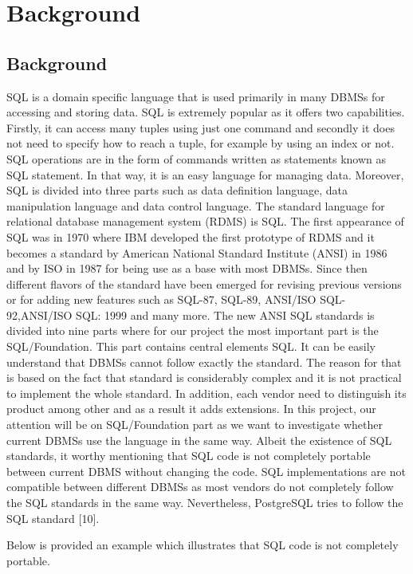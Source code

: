 
\chapter{Background}

\section{Background}
SQL is a domain specific language that is used primarily in many DBMSs for accessing and storing data. SQL is extremely popular as it offers two capabilities. Firstly, it can access many tuples using just one command and secondly it does not need to specify how to reach a tuple, for example by using an index or not. SQL operations are in the form of commands written as statements known as SQL statement. In that way, it is an easy language for managing data. Moreover, SQL is divided into three parts such as data definition language, data manipulation language and data control language. 
	The standard language for relational database management system (RDMS) is SQL. The first appearance of SQL was in 1970 where IBM developed the first prototype of RDMS and it becomes a standard by American National Standard Institute (ANSI) in 1986 and by ISO in 1987 for being use as a base with most DBMSs. Since then different flavors of the standard have been emerged for revising previous versions or for adding new features such as SQL-87, SQL-89, ANSI/ISO SQL-92,ANSI/ISO SQL: 1999 and many more. The new ANSI SQL standards is divided into nine parts where for our project the most important part is the SQL/Foundation. This part contains central elements SQL. It can be easily understand that DBMSs cannot follow exactly the standard. The reason for that is based on the fact that standard is considerably complex and it is not practical to implement the whole standard. In addition, each vendor need to distinguish its product among other and as a result it adds extensions.
In this project, our attention will be on SQL/Foundation part as we want to investigate whether current DBMSs use the language in the same way. 
Albeit the existence of SQL standards, it worthy mentioning that SQL code is not completely portable between current DBMS without changing the code. SQL implementations are not compatible between different DBMSs as most vendors do not completely follow the SQL standards in the same way. Nevertheless, PostgreSQL tries to follow the SQL standard [10]. 


 

Below is provided an example which illustrates that SQL code is not completely portable.

